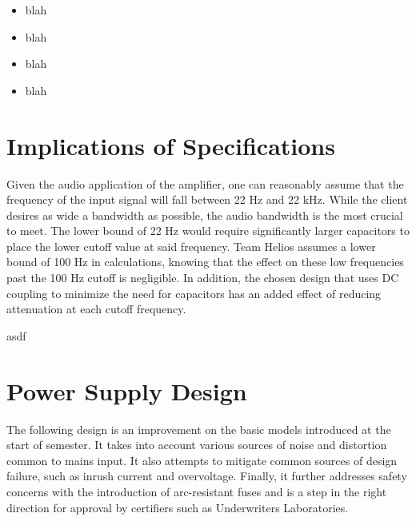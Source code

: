 \documentclass[journal]{IEEEtran}
\begin{document}
\begin{itemize}
\item
blah
\item
blah
\item
blah
\item
blah
\end{itemize}


\section{Implications of Specifications}

Given the audio application of the amplifier, one can reasonably assume that the frequency of the input signal will fall between 22 Hz and 22 kHz. While the client desires as wide a bandwidth as possible, the audio bandwidth is the most crucial to meet. The lower bound of 22 Hz would require significantly larger capacitors to place the lower cutoff value at said frequency. Team Helios assumes a lower bound of 100 Hz in calculations, knowing that the effect on these low frequencies past the 100 Hz cutoff is negligible. In addition, the chosen design that uses DC coupling to minimize the need for capacitors has an added effect of reducing attenuation at each cutoff frequency.

asdf

\section{Power Supply Design}

The following design is an improvement on the basic models introduced at the start of semester. It takes into account various sources of noise and distortion common to mains input. It also attempts to mitigate common sources of design failure, such as inrush current and overvoltage. Finally, it further addresses safety concerns with the introduction of arc-resistant fuses and is a step in the right direction for approval by certifiers such as Underwriters Laboratories. 
\end{document}
